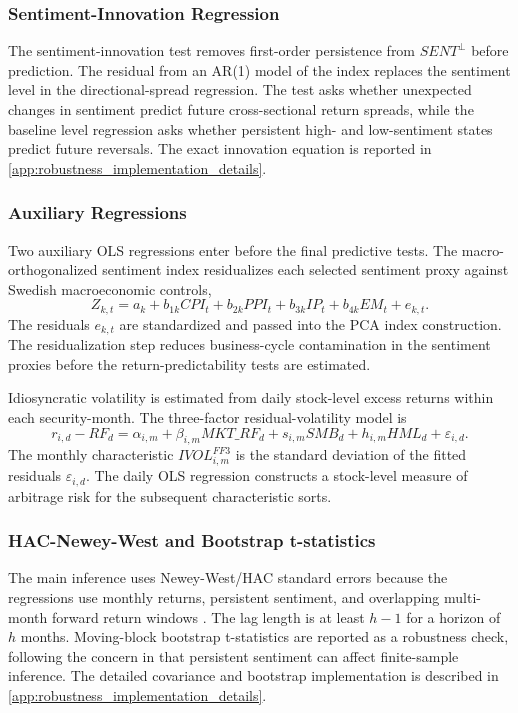 \documentclass[11pt]{article}
\newcommand{\var}[1]{\ensuremath{#1}}
\begin{document}
\subsubsection{Sentiment-Innovation Regression}
The sentiment-innovation test removes first-order persistence from \var{SENT^{\perp}} before prediction. The residual from an AR(1) model of the index replaces the sentiment level in the directional-spread regression. The test asks whether unexpected changes in sentiment predict future cross-sectional return spreads, while the baseline level regression asks whether persistent high- and low-sentiment states predict future reversals. The exact innovation equation is reported in \cref{app:robustness_implementation_details}.

\subsubsection{Auxiliary Regressions}
Two auxiliary OLS regressions enter before the final predictive tests. The macro-orthogonalized sentiment index residualizes each selected sentiment proxy against Swedish macroeconomic controls,
\begin{equation}
    Z_{k,t}
    =
    a_k
    + b_{1k} CPI_t
    + b_{2k} PPI_t
    + b_{3k} IP_t
    + b_{4k} EM_t
    + e_{k,t}.
\end{equation}
The residuals \var{e_{k,t}} are standardized and passed into the PCA index construction. The residualization step reduces business-cycle contamination in the sentiment proxies before the return-predictability tests are estimated.

Idiosyncratic volatility is estimated from daily stock-level excess returns within each security-month. The three-factor residual-volatility model is
\begin{equation}
    r_{i,d} - RF_d
    =
    \alpha_{i,m}
    + \beta_{i,m} MKT\_RF_d
    + s_{i,m} SMB_d
    + h_{i,m} HML_d
    + \varepsilon_{i,d}.
\end{equation}
The monthly characteristic \var{IVOL^{FF3}_{i,m}} is the standard deviation of the fitted residuals \var{\varepsilon_{i,d}}. The daily OLS regression constructs a stock-level measure of arbitrage risk for the subsequent characteristic sorts.

\subsubsection{HAC-Newey-West and Bootstrap t-statistics}
The main inference uses Newey-West/HAC standard errors because the regressions use monthly returns, persistent sentiment, and overlapping multi-month forward return windows \citep{newey1987simple}. The lag length is at least \var{h-1} for a horizon of \var{h} months. Moving-block bootstrap t-statistics are reported as a robustness check, following the concern in \citet{baker2006sentiment} that persistent sentiment can affect finite-sample inference. The detailed covariance and bootstrap implementation is described in \cref{app:robustness_implementation_details}.
\end{document}
